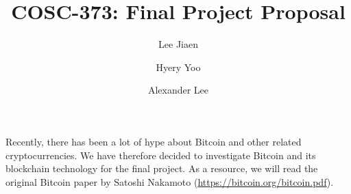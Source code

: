 \documentclass{amsart}
\title{COSC-373: Final Project Proposal}
\author{Lee Jiaen}
\author{Hyery Yoo}
\author{Alexander Lee}
\begin{document}
\maketitle

Recently, there has been a lot of hype about Bitcoin and other related
cryptocurrencies. We have therefore decided to investigate Bitcoin and its
blockchain technology for the final project. As a resource, we will read the
original Bitcoin paper by Satoshi Nakamoto
(\url{https://bitcoin.org/bitcoin.pdf}).
\end{document}
